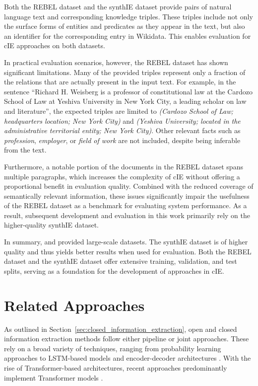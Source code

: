 \documentclass[a4paper,oneside,bibliography=totoc]{scrbook}
\begin{document}
Both the REBEL dataset and the synthIE dataset provide pairs of natural language text and corresponding knowledge triples. These triples include not only the surface forms of entities and predicates as they appear in the text, but also an identifier for the corresponding entry in Wikidata. This enables evaluation for \ac{cIE} approaches on both datasets.

In practical evaluation scenarios, however, the REBEL dataset has shown significant limitations. Many of the provided triples represent only a fraction of the relations that are actually present in the input text. For example, in the sentence \enquote{Richard H. Weisberg is a professor of constitutional law at the Cardozo School of Law at Yeshiva University in New York City, a leading scholar on law and literature}, the expected triples are limited to \textit{(Cardozo School of Law; headquarters location; New York City)} and \textit{(Yeshiva University; located in the administrative territorial entity; New York City)}. Other relevant facts such as \textit{profession}, \textit{employer}, or \textit{field of work} are not included, despite being inferable from the text.

Furthermore, a notable portion of the documents in the REBEL dataset spans multiple paragraphs, which increases the complexity of \ac{cIE} without offering a proportional benefit in evaluation quality. Combined with the reduced coverage of semantically relevant information, these issues significantly impair the usefulness of the REBEL dataset as a benchmark for evaluating system performance. As a result, subsequent development and evaluation in this work primarily rely on the higher-quality synthIE dataset.

In summary, \citet{HuguetCabot2021} and \citet{Josifoski2023} provided large-scale datasets. The synthIE dataset is of higher quality and thus yields better results when used for evaluation. Both the REBEL dataset and the synthIE dataset offer extensive training, validation, and test splits, serving as a foundation for the development of approaches in \ac{cIE}.

\section{Related Approaches}
\label{sec:related_approaches}

As outlined in Section~\ref{sec:closed_information_extraction}, open and closed information extraction methods follow either pipeline or joint approaches. These rely on a broad variety of techniques, ranging from probability learning approaches to LSTM-based models and encoder-decoder architectures \cite{Zhang2022,Angeli2015,Trisedya2019}. With the rise of Transformer-based architectures, recent approaches predominantly implement Transformer models \cite{Josifoski2021,Josifoski2023,Moeller2024}.
\end{document}
